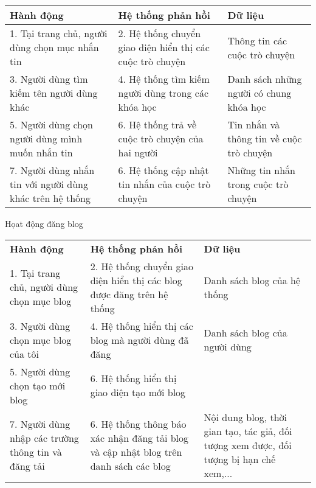 \documentclass[./../main_file.tex]{subfiles}
\begin{document}
\begin{longtable}{|p{}|p{}|p{}|}
		\hline
		\textbf{Hành động}                             & \textbf{Hệ thống phản hồi}                                & \textbf{Dữ liệu}                       \\ \hline
		1. Tại trang chủ, người dùng chọn mục nhắn tin & 2. Hệ thống chuyển giao diện hiển thị các cuộc trò chuyện & Thông tin các cuộc trò chuyện          \\ \hline
		3. Người dùng tìm kiếm tên người dùng khác     & 4. Hệ thống tìm kiếm người dùng trong các khóa học         & Danh sách những người có chung khóa học \\ \hline
		5. Người dùng chọn người dùng mình muốn nhắn tin         & 6. Hệ thống trả về cuộc trò chuyện của hai người  & Tin nhắn và thông tin về cuộc trò chuyện \\ \hline
		7. Người dùng nhắn tin với người dùng khác trên hệ thống & 6. Hệ thống cập nhật tin nhắn của cuộc trò chuyện & Những tin nhắn trong cuộc trò chuyện     \\ \hline
\end{longtable}
Họat động đăng blog
\begin{longtable}{|p{}|p{}|p{}|}
		\hline
		\textbf{Hành động} & \textbf{Hệ thống phản hồi} & \textbf{Dữ liệu} \\
		1. Tại trang chủ, người dùng chọn mục blog & 2. Hệ thống chuyển giao diện hiển thị các blog được đăng trên hệ thống & Danh sách blog của hệ thống \\ \hline
		3. Người dùng chọn mục blog của tôi & 4. Hệ thống hiển thị các blog mà người dùng đã đăng & Danh sách blog của người dùng \\ \hline
		5. Người dùng chọn tạo mới blog & 6. Hệ thống hiển thị giao diện tạo mới blog &  \\ \hline
	7. Người dùng nhập các trường thông tin và đăng tải & 6. Hệ thống thông báo xác nhận đăng tải blog và cập nhật blog trên danh sách các blog & Nội dung blog, thời gian tạo, tác giả, đối tượng xem được, đối tượng bị hạn chế xem,... \\ \hline

\end{longtable}
\end{document}
